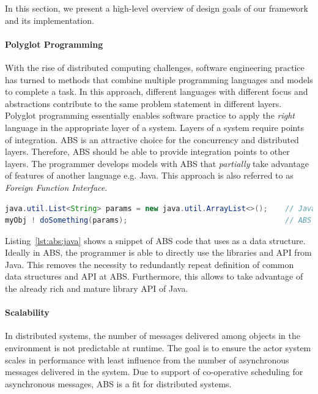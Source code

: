 In this section, we present a high-level overview of design goals of our framework and its implementation. 

\paragraph{Polyglot Programming}
With the rise of distributed computing challenges, software engineering practice has turned to methods that combine multiple programming languages and models to complete a task. 
In this approach, different languages with different focus and abstractions contribute to the same problem statement in different layers. 
Polyglot programming essentially enables software practice to apply the \emph{right} language in the appropriate layer of a system.
Layers of a system require points of integration.
ABS is an attractive choice for the concurrency and distributed layers.
Therefore, ABS should be able to provide integration points to other layers.
The programmer develops models with ABS that \emph{partially} take advantage of features of another language e.g. Java.
This approach is also referred to as \emph{Foreign Function Interface}.

\begin{lstlisting}[float=h,language=Java,caption=Using Java in ABS,label=lst:abs:java]
java.util.List<String> params = new java.util.ArrayList<>();    // Java
myObj ! doSomething(params);                                    // ABS
\end{lstlisting}

Listing~\ref{lst:abs:java} shows a snippet of ABS code that uses  as a data structure.
Ideally in ABS, the programmer is able to directly use the libraries and API from Java.
This removes the necessity to redundantly repeat definition of common data structures and API at ABS.
Furthermore, this allows to take advantage of the already rich and mature library API of Java.

\paragraph{Scalability} 
In distributed systems, the number of messages delivered among objects in the 
environment is not predictable at runtime.
The goal is to ensure the actor system scales in performance with least 
influence from the number of asynchronous messages delivered in the system.
Due to support of co-operative scheduling for asynchronous messages, ABS is a fit for distributed systems.

